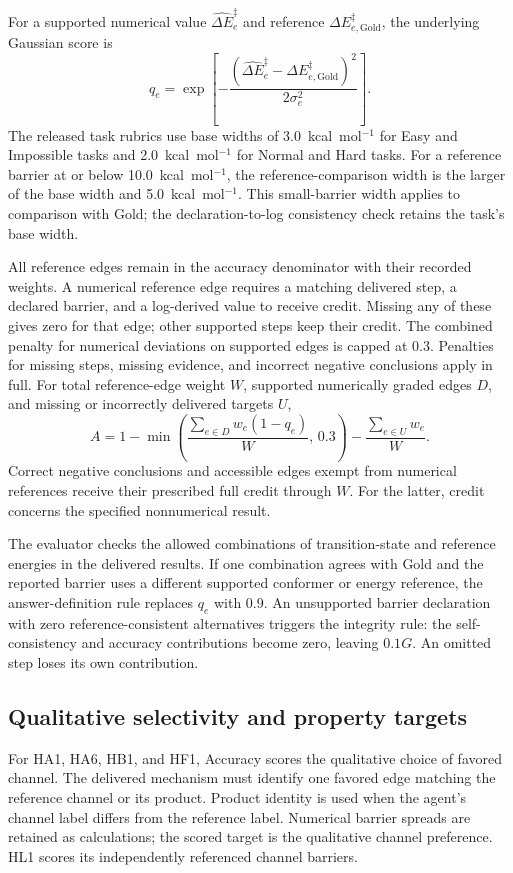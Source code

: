 For a supported numerical value $\widehat{\Delta E}_e^{\ddagger}$ and reference $\Delta E_{e,\mathrm{Gold}}^{\ddagger}$, the underlying Gaussian score is
\begin{equation}
q_e=\exp\left[-\frac{\left(\widehat{\Delta E}_e^{\ddagger}-
\Delta E_{e,\mathrm{Gold}}^{\ddagger}\right)^2}{2\sigma_e^2}\right].
\label{eq:si-gaussian}
\end{equation}
The released task rubrics use base widths of 3.0~kcal~mol$^{-1}$ for Easy and Impossible tasks and 2.0~kcal~mol$^{-1}$ for Normal and Hard tasks. For a reference barrier at or below 10.0~kcal~mol$^{-1}$, the reference-comparison width is the larger of the base width and 5.0~kcal~mol$^{-1}$. This small-barrier width applies to comparison with Gold; the declaration-to-log consistency check retains the task's base width.

All reference edges remain in the accuracy denominator with their recorded weights. A numerical reference edge requires a matching delivered step, a declared barrier, and a log-derived value to receive credit. Missing any of these gives zero for that edge; other supported steps keep their credit. The combined penalty for numerical deviations on supported edges is capped at 0.3. Penalties for missing steps, missing evidence, and incorrect negative conclusions apply in full. For total reference-edge weight $W$, supported numerically graded edges $D$, and missing or incorrectly delivered targets $U$,
\begin{equation}
A=1-\min\!\left(\frac{\sum_{e\in D}w_e(1-q_e)}{W},\,0.3\right)
-\frac{\sum_{e\in U}w_e}{W}.
\label{eq:si-accuracy-aggregation}
\end{equation}
Correct negative conclusions and accessible edges exempt from numerical references receive their prescribed full credit through $W$. For the latter, credit concerns the specified nonnumerical result.

The evaluator checks the allowed combinations of transition-state and reference energies in the delivered results. If one combination agrees with Gold and the reported barrier uses a different supported conformer or energy reference, the answer-definition rule replaces $q_e$ with 0.9. An unsupported barrier declaration with zero reference-consistent alternatives triggers the integrity rule: the self-consistency and accuracy contributions become zero, leaving $0.1G$. An omitted step loses its own contribution.

\subsection{Qualitative selectivity and property targets}
For HA1, HA6, HB1, and HF1, Accuracy scores the qualitative choice of favored channel. The delivered mechanism must identify one favored edge matching the reference channel or its product. Product identity is used when the agent's channel label differs from the reference label. Numerical barrier spreads are retained as calculations; the scored target is the qualitative channel preference. HL1 scores its independently referenced channel barriers.

